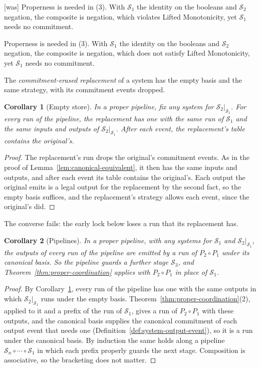 \documentclass[sigconf]{cidr-2027}
\newtheorem{corollary}{Corollary}
\theoremstyle{remark}
\newcommand{\commitment}{commitment\xspace}
\newcommand{\Spec}{\mathcal{S}}
\begin{document}
{\footnotesize\color{black!50}\noindent\textsf{[was]} Properness is needed in (3).  With $\Spec_1$ the identity on the booleans and
$\Spec_2$ negation, the composite is negation, which violates Lifted
Monotonicity, yet $\Spec_1$ needs no \commitment.\par}

\color{blue!70!black}Properness is needed in (3).  With $\Spec_1$ the identity on the booleans and
$\Spec_2$ negation, the composite is negation, which does not satisfy Lifted
Monotonicity, yet $\Spec_1$ needs no \commitment.\color{black}

The \emph{\commitment-erased replacement} of a system has the empty basis and
the same strategy, with its \commitment events dropped.

\begin{corollary}[Empty store]
\label{cor:empty-store}
In a proper pipeline, fix any system for $\Spec_2|_{\Spec_1}$.  For every run
of the pipeline, the replacement has one with the same run of $\Spec_1$ and
the same inputs and outputs of $\Spec_2|_{\Spec_1}$.  After each event, the
replacement's table contains the original's.
\end{corollary}

\begin{proof}
The replacement's run drops the original's \commitment events.  As in the
proof of Lemma~\ref{lem:canonical-equivalent}, it then has the same inputs and
outputs, and after each event its table contains the original's.  Each output
the original emits is a legal output for the replacement by the second fact,
so the empty basis suffices, and the replacement's strategy allows each event,
since the original's did.
\end{proof}

The converse fails: the early lock below loses a run that its replacement has.

\begin{corollary}[Pipelines]
\label{cor:pipelines}
In a proper pipeline, with any systems for $\Spec_1$ and
$\Spec_2|_{\Spec_1}$, the outputs of every run of the pipeline are emitted by
a run of $P_2\circ P_1$ under its canonical basis.  So the pipeline guards a
further stage $\Spec_3$, and Theorem~\ref{thm:proper-coordination} applies
with $P_2\circ P_1$ in place of $\Spec_1$.
\end{corollary}

\begin{proof}
By Corollary~\ref{cor:empty-store}, every run of the pipeline has one with the
same outputs in which $\Spec_2|_{\Spec_1}$ runs under the empty basis.
Theorem~\ref{thm:proper-coordination}(2), applied to it and a prefix of the
run of $\Spec_1$, gives a run of $P_2\circ P_1$ with these outputs, and the
canonical basis supplies the canonical \commitment of each output event that
needs one (Definition~\ref{def:system-output-event}), so it is a run under the
canonical basis.  By induction the same holds along a pipeline
$\Spec_n\circ\cdots\circ\Spec_1$ in which each prefix properly guards the next
stage.  Composition is associative, so the bracketing does not matter.
\end{proof}
\end{document}
